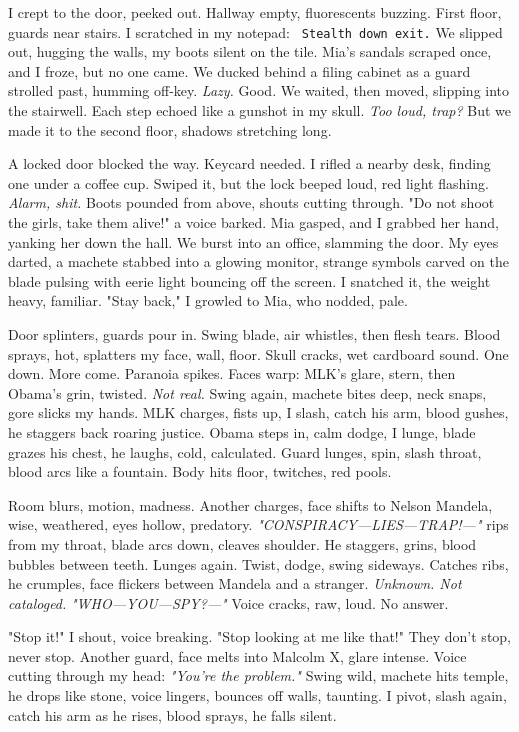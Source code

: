 \documentclass[12pt]{article} %
\newcommand{\note}[1]{\texttt{\small \color{DarkGray} #1}}
\begin{document}
I crept to the door, peeked out. Hallway empty, fluorescents buzzing. First floor, guards near stairs. I scratched in my notepad: \note{Stealth down exit.} We slipped out, hugging the walls, my boots silent on the tile. \textnormal{Mia}’s sandals scraped once, and I froze, but no one came. We ducked behind a filing cabinet as a guard strolled past, humming off-key. \textit{Lazy.} Good. We waited, then moved, slipping into the stairwell. Each step echoed like a gunshot in my skull. \textit{Too loud, trap?} But we made it to the second floor, shadows stretching long.

A locked door blocked the way. Keycard needed. I rifled a nearby desk, finding one under a coffee cup. Swiped it, but the lock beeped loud, red light flashing. \textit{Alarm, shit.} Boots pounded from above, shouts cutting through. "Do not shoot the girls, take them alive!" a voice barked. \textnormal{Mia} gasped, and I grabbed her hand, yanking her down the hall. We burst into an office, slamming the door. My eyes darted, a machete stabbed into a glowing monitor, strange symbols carved on the blade pulsing with eerie light bouncing off the screen. I snatched it, the weight heavy, familiar. "Stay back," I growled to \textnormal{Mia}, who nodded, pale.

Door splinters, guards pour in. Swing blade, air whistles, then flesh tears. Blood sprays, hot, splatters my face, wall, floor. Skull cracks, wet cardboard sound. One down. More come. Paranoia spikes. Faces warp: \textnormal{MLK}’s glare, stern, then \textnormal{Obama}’s grin, twisted. \textit{Not real.} Swing again, machete bites deep, neck snaps, gore slicks my hands. \textnormal{MLK} charges, fists up, I slash, catch his arm, blood gushes, he staggers back roaring justice. \textnormal{Obama} steps in, calm dodge, I lunge, blade grazes his chest, he laughs, cold, calculated. Guard lunges, spin, slash throat, blood arcs like a fountain. Body hits floor, twitches, red pools.

Room blurs, motion, madness. Another charges, face shifts to \textnormal{Nelson Mandela}, wise, weathered, eyes hollow, predatory. \textit{"CONSPIRACY—LIES—TRAP!—"} rips from my throat, blade arcs down, cleaves shoulder. He staggers, grins, blood bubbles between teeth. Lunges again. Twist, dodge, swing sideways. Catches ribs, he crumples, face flickers between \textnormal{Mandela} and a stranger. \textit{Unknown. Not cataloged.} \textit{"WHO—YOU—SPY?—"} Voice cracks, raw, loud. No answer.

"Stop it!" I shout, voice breaking. "Stop looking at me like that!" They don’t stop, never stop. Another guard, face melts into \textnormal{Malcolm X}, glare intense. Voice cutting through my head: \textit{"You’re the problem."} Swing wild, machete hits temple, he drops like stone, voice lingers, bounces off walls, taunting. I pivot, slash again, catch his arm as he rises, blood sprays, he falls silent.
\end{document}
